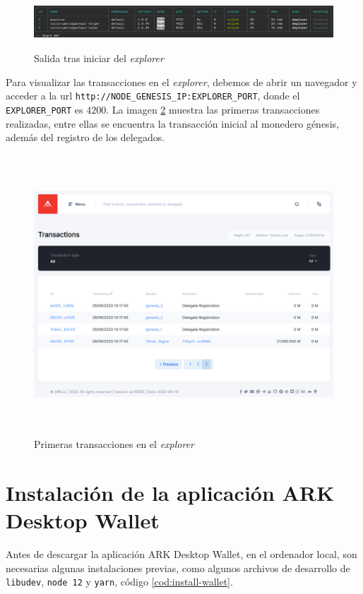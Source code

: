 \begin{figure}[H]
	\centering
	\includegraphics[width=14.5cm,height=2cm]{figuras/Instalacion_explorer.png}
	\caption{Salida tras iniciar del \textit{explorer}}
	\label{fig:install-explorer}
\end{figure}

Para visualizar las transacciones en el \textit{explorer}, debemos de abrir un navegador y acceder a la url \texttt{http://NODE\_GENESIS\_IP:EXPLORER\_PORT}, donde el \texttt{EXPLORER\_PORT} es $4200$. La imagen \ref{fig:nav-explorer} muestra las primeras transacciones realizadas, entre ellas se encuentra la transacción inicial al monedero génesis, además del registro de los delegados.

\begin{figure}[H]
	\centering
	\includegraphics[width=14.5cm,height=10.5cm]{figuras/Navegacion_explorer.png}
	\caption{Primeras transacciones en el \textit{explorer}}
	\label{fig:nav-explorer}
\end{figure}


\newpage
\section{Instalación de la aplicación ARK Desktop Wallet}

Antes de descargar la aplicación ARK Desktop Wallet, en el ordenador local, son necesarias algunas instalaciones previas, como algunos archivos de desarrollo de \texttt{libudev}, \texttt{node 12} y \texttt{yarn}, código \ref{cod:install-wallet}.

